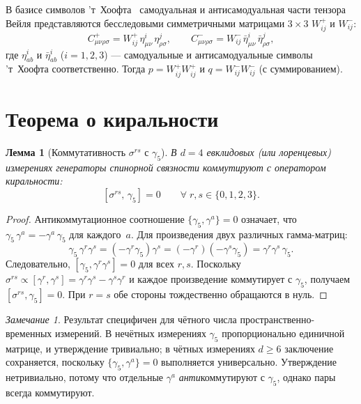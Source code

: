 \documentclass[12pt,a4paper]{article}
\newtheorem{lemma}[theorem]{Лемма}
\theoremstyle{definition}
\theoremstyle{remark}
\newtheorem{remark}[theorem]{Замечание}
\begin{document}
В базисе символов 'т~Хоофта~\cite{tHooft:1976snw} самодуальная и
антисамодуальная части тензора Вейля представляются бесследовыми
симметричными матрицами $3 \times 3$ $W^+_{ij}$ и $W^-_{ij}$:
\begin{equation}
  C^+_{\mu\nu\rho\sigma} = W^+_{ij}\,\eta^i_{\mu\nu}\,\eta^j_{\rho\sigma},
  \qquad
  C^-_{\mu\nu\rho\sigma} = W^-_{ij}\,\bar\eta^i_{\mu\nu}\,\bar\eta^j_{\rho\sigma},
\end{equation}
где $\eta^i_{ab}$ и $\bar\eta^i_{ab}$ ($i = 1,2,3$) --- самодуальные и
антисамодуальные символы 'т~Хоофта соответственно.  Тогда
$p = W^+_{ij}W^+_{ij}$ и $q = W^-_{ij}W^-_{ij}$ (с суммированием).


\section{Теорема о киральности}
\label{sec:chirality}

\begin{lemma}[Коммутативность $\sigma^{rs}$ с $\gamma_5$]
\label{lem:sigma-g5}
В $d = 4$ евклидовых (или лоренцевых) измерениях генераторы спинорной
связности коммутируют с оператором киральности:
\begin{equation}\label{eq:sigma-g5}
  [\sigma^{rs},\, \gamma_5] = 0 \qquad \forall\; r, s \in \{0,1,2,3\}.
\end{equation}
\end{lemma}

\begin{proof}
Антикоммутационное соотношение $\{\gamma_5, \gamma^a\} = 0$ означает, что
$\gamma_5\,\gamma^a = -\gamma^a\,\gamma_5$ для каждого~$a$.
Для произведения двух различных гамма-матриц:
\begin{equation}
  \gamma_5\,\gamma^r\gamma^s
  = (-\gamma^r\gamma_5)\gamma^s
  = (-\gamma^r)(-\gamma^s\gamma_5)
  = \gamma^r\gamma^s\,\gamma_5.
\end{equation}
Следовательно, $[\gamma_5, \gamma^r\gamma^s] = 0$ для всех $r, s$.
Поскольку $\sigma^{rs} \propto [\gamma^r, \gamma^s]
= \gamma^r\gamma^s - \gamma^s\gamma^r$ и каждое произведение коммутирует с
$\gamma_5$, получаем $[\sigma^{rs}, \gamma_5] = 0$.
При $r = s$ обе стороны тождественно обращаются в нуль.
\end{proof}

\begin{remark}
Результат специфичен для чётного числа пространственно-временных измерений.
В нечётных измерениях $\gamma_5$ пропорционально единичной матрице, и
утверждение тривиально; в чётных измерениях $d \geq 6$ заключение
сохраняется, поскольку $\{\gamma_5, \gamma^a\} = 0$ выполняется
универсально.  Утверждение нетривиально, потому что отдельные $\gamma^a$
\emph{анти}коммутируют с $\gamma_5$, однако пары всегда коммутируют.
\end{remark}
\end{document}
